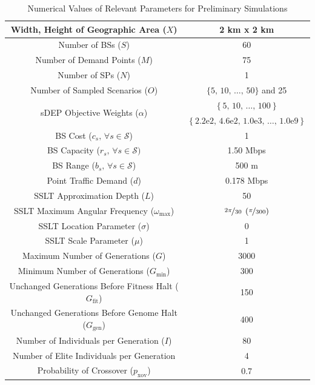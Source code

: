 \documentclass[12pt,dvipsnames]{report}
\newcommand{\expnumber}[2]{{#1}\mathrm{e}{#2}}
\begin{document}
\begin{table}[!htp]
	\centering
	\caption{Numerical Values of Relevant Parameters for Preliminary Simulations}
	\begin{tabular}{|c|c|} 
		\hline
		Width, Height of Geographic Area ($X$) & 2 km x 2 km \\
		\hline
		Number of BSs ($S$) & 60 \\ 
		\hline 
		Number of Demand Points ($M$) & 75 \\ 
		\hline 
		Number of SPs ($N$) & 1 \\
		\hline
		Number of Sampled Scenarios ($O$) & $\{5,\, 10,\, \ldots,\, 50\}$ and 25 \\ 
		\hline 
		\multirow{2}{*}{sDEP Objective Weights ($\alpha$)} & $\left\{ 5,\, 10,\, \ldots,\, 100 \right\}$ \\
		& $\left\{ \expnumber{2.2}{2},\, \expnumber{4.6}{2},\, \expnumber{1.0}{3},\, \ldots,\, \expnumber{1.0}{9} \right\}$ \\
		\hline
		BS Cost ($c_s,\, \forall s \in \mathcal{S}$) & 1 \\ 
		\hline 
		BS Capacity ($r_s,\, \forall s \in \mathcal{S})$ & 1.50 Mbps \\ 
		\hline
		BS Range ($b_s,\, \forall s \in \mathcal{S}$) & 500 m \\
		\hline 
		Point Traffic Demand ($d$) & 0.178 Mbps \\ 
		\hline 
		\hline
		SSLT Approximation Depth ($L$) & 50 \\ 
		\hline
		SSLT Maximum Angular Frequency ($\omega_{\max}$) & $\nicefrac{2 \pi}{30} \; \left( \nicefrac{\pi}{300} \right)$ \\
		\hline 
		SSLT Location Parameter ($\sigma$) & 0 \\ 
		\hline 
		SSLT Scale Parameter ($\mu$) & 1 \\ 
		\hline 
		\hline
		Maximum Number of Generations ($G$) & 3000 \\ 
		\hline
		Minimum Number of Generations ($G_{\min}$) & 300 \\
		\hline
		Unchanged Generations Before Fitness Halt ($G_{\text{fit}}$) & 150 \\
		\hline 
		Unchanged Generations Before Genome Halt ($G_{\text{gen}}$) & 400 \\
		\hline 
		Number of Individuals per Generation ($I$) & 80 \\ 
		\hline
		Number of Elite Individuals per Generation & 4 \\
		\hline 
		Probability of Crossover ($p_\text{xov}$) & 0.7 \\ 

\end{tabular}
\end{table}
\end{document}
